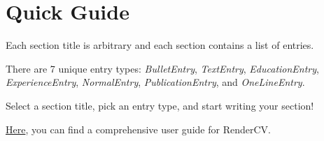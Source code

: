 \section{Quick Guide}
\begin{onecolentry}
    \begin{highlightsforbulletentries}
        \item Each section title is arbitrary and each section contains a list of entries.
        \item There are 7 unique entry types: \textit{BulletEntry}, \textit{TextEntry}, \textit{EducationEntry}, \textit{ExperienceEntry}, \textit{NormalEntry}, \textit{PublicationEntry}, and \textit{OneLineEntry}.
        \item Select a section title, pick an entry type, and start writing your section!
        \item \href{https://docs.rendercv.com/user_guide/}{Here}, you can find a comprehensive user guide for RenderCV.\@
    \end{highlightsforbulletentries}
\end{onecolentry}
